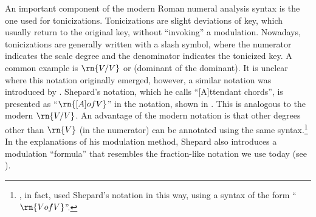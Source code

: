 




An important component of the modern Roman numeral analysis
syntax is the one used for tonicizations. Tonicizations are
slight deviations of key, which usually return to the
original key, without ``invoking'' a modulation. Nowadays,
tonicizations are generally written with a slash symbol,
where the numerator indicates the scale degree and the
denominator indicates the tonicized key. A common example is
$\rn{V/V}$ or (dominant of the dominant). It is unclear
where this notation originally emerged, however, a similar
notation was introduced by \textcite{shepard1889how}.
Shepard's notation, which he calls ``[A]ttendant chords'',
is presented as ``$\rn{[A] of V}$'' in the notation, shown
in . This is
analogous to the modern $\rn{V/V}$. An advantage of the
modern notation is that other degrees other than $\rn{V}$
(in the numerator) can be annotated using the same
syntax.\footnote{\textcite{piston1941harmony}, in fact, used
Shepard's notation in this way, using a syntax of the form
``$\rn{V of V}$''.} In the explanations of his modulation
method, Shepard also introduces a modulation ``formula''
that resembles the fraction-like notation we use today (see
). 




